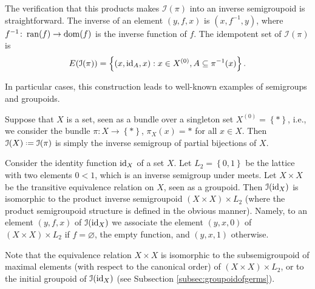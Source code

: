 The verification that this products makes $\mathcal{I}(\pi)$ into an inverse semigroupoid is straightforward. The inverse of an element $(y,f,x)$ is $(x,f^{-1},y)$, where $f^{-1}\colon\operatorname{ran}(f)\to\operatorname{dom}(f)$ is the inverse function of $f$. The idempotent set of $\mathcal{I}(\pi)$ is
\[E(\mathcal{I}(\pi))=\left\{(x,\operatorname{id}_A,x):x\in X^{(0)},A\subseteq\pi^{-1}(x)\right\}.\]

In particular cases, this construction leads to well-known examples of semigroups and groupoids.

\begin{example}
Suppose that $X$ is a set, seen as a bundle over a singleton set $X^{(0)}=\left\{\ast\right\}$, i.e., we consider the bundle $\pi\colon X\to\left\{\ast\right\}$, $\pi_X(x)=\ast$ for all $x\in X$. Then $\mathcal{I}(X)\defeq\mathcal{I}(\pi)$ is simply the inverse semigroup of partial bijections of $X$.
\end{example}

\begin{example}
Consider the identity function $\operatorname{id}_X$ of a set $X$. Let $L_2=\left\{0,1\right\}$ be the lattice with two elements $0<1$, which is an inverse semigroup under meets. Let $X\times X$ be the transitive equivalence relation on $X$, seen as a groupoid. Then $\mathcal{I}(\operatorname{id}_X)$ is isomorphic to the product inverse semigroupoid $(X\times X)\times L_2$ (where the product semigroupoid structure is defined in the obvious manner). Namely, to an element $(y,f,x)$ of $\mathcal{I}(\operatorname{id}_X)$ we associate the element $(y,x,0)$ of $(X\times X)\times L_2$ if $f=\varnothing$, the empty function, and $(y,x,1)$ otherwise.

Note that the equivalence relation $X\times X$ is isomorphic to the subsemigroupoid of maximal elements (with respect to the canonical order) of $(X\times X)\times L_2$, or to the initial groupoid of $\mathcal{I}(\operatorname{id}_X)$ (see Subsection \ref{subsec:groupoidofgerms}).
\end{example}


